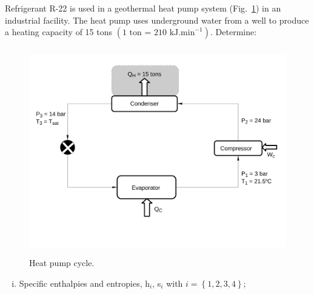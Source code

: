 \documentclass[calculator,steamtables,refrigeranttables,psychrometricchart,datasheet,solutions,resit]{exam}
\begin{document}
\begin{question}

Refrigerant R-22 is used in a geothermal heat pump system (Fig.~\ref{Exam01_Prob4}) in an industrial facility. The heat pump uses underground water from a well to produce a heating capacity of 15 tons $\left(\text{1 ton = 210 kJ.min}^{-1}\right)$. Determine:
\begin{figure}[!h]
\begin{center}
\includegraphics[width=12.0cm,height=9.0cm]{./Pics/Exam_Refrigeration14-15}
\end{center}
\vspace{-1.8cm}
\caption{Heat pump cycle.}\label{Exam01_Prob4}
\end{figure}
\begin{enumerate}[(i)]
 \item Specific enthalpies and entropies, h$_{i}$, s$_{i}$ with $i=\left\{1,2,3,4\right\}$;~
\end{enumerate}
\end{question}
\end{document}
